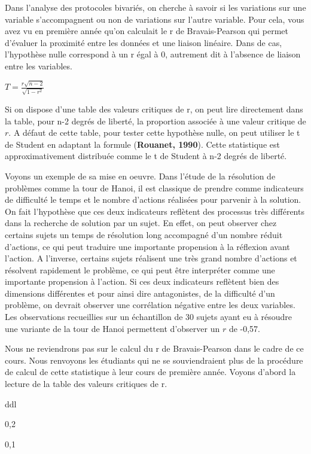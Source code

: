 \documentclass[]{book}
\theoremstyle{definition}
\theoremstyle{definition}
\theoremstyle{definition}
\theoremstyle{remark}
\begin{document}
Dans l'analyse des protocoles bivariés, on cherche à savoir si les
variations sur une variable s'accompagnent ou non de variations sur
l'autre variable. Pour cela, vous avez vu en première année qu'on
calculait le r de Bravais-Pearson qui permet d'évaluer la proximité
entre les données et une liaison linéaire. Dans de cas, l'hypothèse
nulle correspond à un r égal à 0, autrement dit à l'absence de liaison
entre les variables.

\(T = \frac{r\sqrt{n-2}}{\sqrt{1-r^{2}}}\)

Si on dispose d'une table des valeurs critiques de r, on peut lire
directement dans la table, pour n-2 degrés de liberté, la proportion
associée à une valeur critique de \(r\). A défaut de cette table, pour
tester cette hypothèse nulle, on peut utiliser le t de Student en
adaptant la formule (\textbf{Rouanet, 1990}). Cette statistique est
approximativement distribuée comme le t de Student à n-2 degrés de
liberté.

Voyons un exemple de sa mise en oeuvre. Dans l'étude de la résolution de
problèmes comme la tour de Hanoi, il est classique de prendre comme
indicateurs de difficulté le temps et le nombre d'actions réalisées pour
parvenir à la solution. On fait l'hypothèse que ces deux indicateurs
reflètent des processus très différents dans la recherche de solution
par un sujet. En effet, on peut observer chez certains sujets un temps
de résolution long accompagné d'un nombre réduit d'actions, ce qui peut
traduire une importante propension à la réflexion avant l'action. A
l'inverse, certains sujets réalisent une très grand nombre d'actions et
résolvent rapidement le problème, ce qui peut être interpréter comme une
importante propension à l'action. Si ces deux indicateurs reflètent bien
des dimensions différentes et pour ainsi dire antagonistes, de la
difficulté d'un problème, on devrait observer une corrélation négative
entre les deux variables. Les observations recueillies sur un
échantillon de 30 sujets ayant eu à résoudre une variante de la tour de
Hanoi permettent d'observer un \(r\) de -0,57.

Nous ne reviendrons pas sur le calcul du r de Bravais-Pearson dans le
cadre de ce cours. Nous renvoyons les étudiants qui ne se souviendraient
plus de la procédure de calcul de cette statistique à leur cours de
première année. Voyons d'abord la lecture de la table des valeurs
critiques de r.

ddl

0,2

0,1
\end{document}
